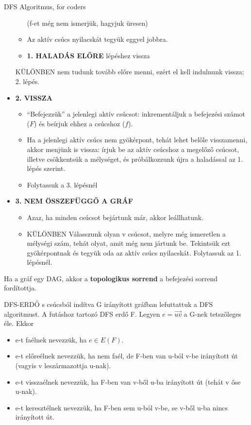 \begin{tetel}{DFS Algoritmus, for coders}
\begin{itemize}
\begin{itemize}
    (f-et még nem ismerjük, hagyjuk üresen)

  \item Az aktív csúcs nyilacskát tegyük eggyel jobbra.

	\item \textbf{1. HALADÁS ELŐRE} lépéshez vissza
	\end{itemize}
    KÜLÖNBEN nem tudunk tovább előre menni, ezért el kell indulnunk vissza; 2. lépés.
\item{\textbf{2. VISSZA}}
  \begin{itemize}
  \item ``Befejezzük'' a jelenlegi aktív csúcsot: inkrementáljuk a befejezési számot ($F$) és beírjuk ehhez a csúcshoz ($f$).
  \item Ha a jelenlegi aktív csúcs nem gyökérpont, tehát lehet belőle visszamenni, akkor menjünk is vissza: írjuk be az aktív csúcshoz a megelőző csúcsot, illetve csökkentsük a mélységet, és próbálkozzunk újra a haladással az 1. lépés szerint.
  \item Folytassuk a 3. lépésnél
  \end{itemize}
\item \textbf{3. NEM ÖSSZEFÜGGŐ A GRÁF}
  \begin{itemize}
  \item Azaz, ha minden csúcsot bejártunk már, akkor leállhatunk.
  \item KÜLÖNBEN Válasszunk olyan v csúcsot, melyre még ismeretlen a mélységi szám, tehát olyat, amit még nem jártunk be. Tekintsük ezt gyökérpontnak és tegyük oda az aktív csúcs nyilacskát. Folytassuk az 1. lépésnél.
  \end{itemize}
\end{itemize}

Ha a gráf egy DAG, akkor a \textbf{topologikus sorrend} a befejezési sorrend fordítottja.
\end{tetel}

\begin{definicio}{DFS-ERDŐ}
s csúcsból indítva G irányított gráfban lefuttattuk a DFS algoritmust. A futáshoz tartozó DFS erdő F. Legyen $e=\overrightarrow{uv}$ a G-nek tetszőleges éle. Ekkor
\begin{itemize}
\item e-t faélnek nevezzük, ha $e \in E(F)$.
\item e-t előreélnek nevezzük, ha nem faél, de F-ben van u-ból v-be irányított út (vagyis v leszármazottja u-nak).
\item e-t visszaélnek nevezzük, ha F-ben van v-ből u-ba irányított út (tehát v őse u-nak).
\item e-t keresztélnek nevezzük, ha F-ben sem u-ból v-be, se v-ből u-ba nincs irányított út.
\end{itemize}
\end{definicio}

